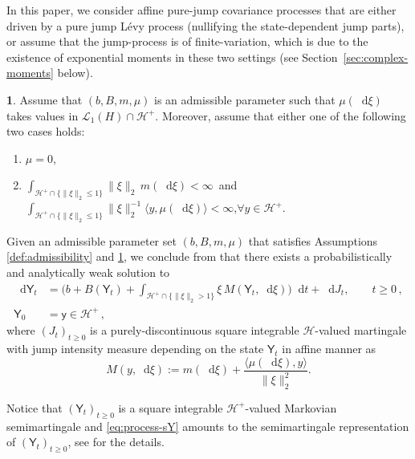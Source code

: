 \documentclass[10pt,a4paper,reqno]{amsart}
\makeatletter
\newcommand*\D{\mathop{}\!\mathrm{d}}
\numberwithin{equation}{section}
\theoremstyle{plain}
\theoremstyle{definition}
\theoremstyle{example}
\newtheorem*{assumption*}{\assumptionnumber}
\providecommand{\assumptionnumber}{}
\newenvironment{assumption}[2]
 {%
  \renewcommand{\assumptionnumber}{Assumption #1$\mathfrak{#2}$}%
  \begin{assumption*}%
  \protected@edef\@currentlabel{#1$
  \mathfrak{#2}$}%
 }
 {%
  \end{assumption*}
 }
\newcommand{\cH}{\mathcal{H}}
\newcommand{\cL}{\mathcal{L}}
\newcommand{\sY}{\mathsf{Y}}
\newcommand{\norm}[1]{\|#1\|}
\newcommand{\cHplus}{\cH^{+}}
\makeatother
\begin{document}
In this paper, we consider affine pure-jump covariance processes that are either driven by a pure jump L\'evy process (nullifying the state-dependent jump parts), or assume that the jump-process is of finite-variation, which is due to the existence of exponential moments in these two settings (see Section~\ref{sec:complex-moments} below).

\begin{assumption}{}{B}\label{ass:chkk-finite-variation}
Assume that $(b,B,m, \mu)$ is an admissible parameter such that $\mu(\D\xi)$ takes values in $\cL_{1}(H)\cap\cHplus$. Moreover, assume that either one of the following two cases holds:
\begin{enumerate}
    \item[(i)] $\mu=0$,
\item[(ii)] 
$\int_{\cHplus \cap\{ \norm{\xi}_2\leq 1\}} \|\xi\|_2\,m(\D\xi) < \infty\,$ and 
$\int_{\cHplus \cap \{\norm{\xi}_2\leq 1\}} \|\xi\|_2^{-1}\langle y,\mu (\D
\xi)\rangle < \infty$,\quad $\forall y\in\cHplus.$
\end{enumerate}
\end{assumption}


 Given an admissible parameter set $(b, B, m, \mu)$ that satisfies Assumptions \ref{def:admissibility} and \ref{ass:chkk-finite-variation}, we conclude from \cite[Theorem 2.8]{CKK22a} that there exists a probabilistically and analytically weak solution to
\begin{align}\label{eq:process-sY}
\D \sY_{t} &=\Big(b+B(\sY_{t})+\int_{\cHplus \cap \{\norm{\xi}_2> 1\}}\xi \,M(\sY_t,\D\xi)\Big)\D t+ \D J_{t},   \qquad t\geq 0\,,\\
\sY_0 &= \mathsf{y} \in \cH^+\,,\nonumber
\end{align}
where $(J_t)_{t\geq 0}$ is a purely-discontinuous square integrable $\cH$-valued martingale with jump intensity measure depending on the state $\sY_t$ in affine manner as
\begin{equation}\label{eq:measure-M}
M(y, \D \xi):= m(\D\xi)+ \frac{\langle \mu(\D\xi), y\rangle}{\|\xi\|_2^2}.
\end{equation}


Notice that $(\sY_t)_{t\geq 0}$ is a square integrable $\cH^+$-valued Markovian semimartingale and \eqref{eq:process-sY} amounts to the semimartingale representation of $(\sY_t)_{t\geq 0}$, see \cite[Proposition 2.6]{CKK22b} for the details. 
\end{document}
